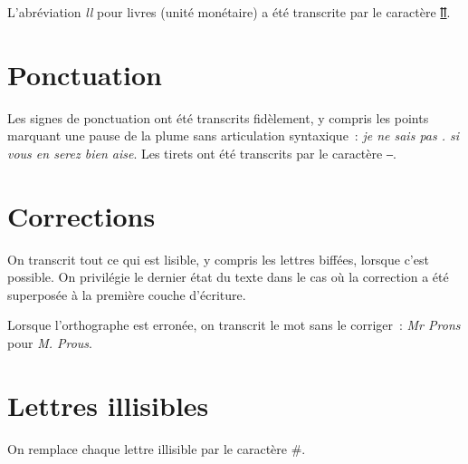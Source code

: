 \documentclass[a4paper,12pt,twoside]{book}
\begin{document}
			L'abréviation \textit{ll} pour livres (unité monétaire) a été transcrite par le caractère \href{https://mufi.info/m.php?p=muficharinfo&i=4088}{ỻ}.

		\section{Ponctuation}
			Les signes de ponctuation ont été transcrits fidèlement, y compris les points marquant une pause de la plume sans articulation syntaxique~: \textit{je ne sais pas . si vous en serez bien aise}. Les tirets ont été transcrits par le caractère ‒.
		
		\section{Corrections}
			On transcrit tout ce qui est lisible, y compris les lettres biffées, lorsque c'est possible. On privilégie le dernier état du texte dans le cas où la correction a été superposée à la première couche d'écriture.
		
			Lorsque l'orthographe est erronée, on transcrit le mot sans le corriger~: \textit{Mr Prons} pour \textit{M. Prous}.
		
		\section{Lettres illisibles}
			On remplace chaque lettre illisible par le caractère \#.
           	
	\printbibheading[heading=bibintoc]%
	\printbibliography[heading=subbibliography, title=Scripts, keyword=scripts]
\end{document}
